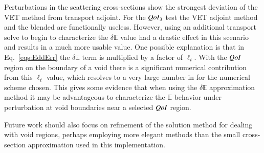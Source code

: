 \documentclass{anstrans}
\newcommand{\Edd}{\mathbb{E}}
\newcommand{\isigt}{\ell_t}
\newcommand{\qoi}{{\it QoI}\xspace}
\begin{document}
Perturbations in the scattering cross-sections show the strongest deviation of  the VET method from transport adjoint. For the $\qoi_3$ test the VET adjoint method and the blended are functionally useless. However, using an additional transport solve to begin to characterize the $\delta \Edd$ value had a drastic effect in this scenario and results in a much more usable value. One possible explanation is that in Eq.~\eqref{eqs:EddErr} the $\delta \Edd$ term is multiplied by a factor of $\isigt$. With the $\qoi$ region on the boundary of a void there is a significant numerical contribution from this $\isigt$ value, which resolves to a very large number in for the numerical scheme chosen. This gives some evidence that when using the $\delta \Edd$ approximation method it may be advantageous to characterize the $\Edd$ behavior under perturbation at void boundaries near a selected $\qoi$ region.

Future work should also focus on refinement of the solution method for dealing with void regions, perhaps employing more elegant methods than the small cross-section approximation used in this implementation. 

\appendix
\end{document}
